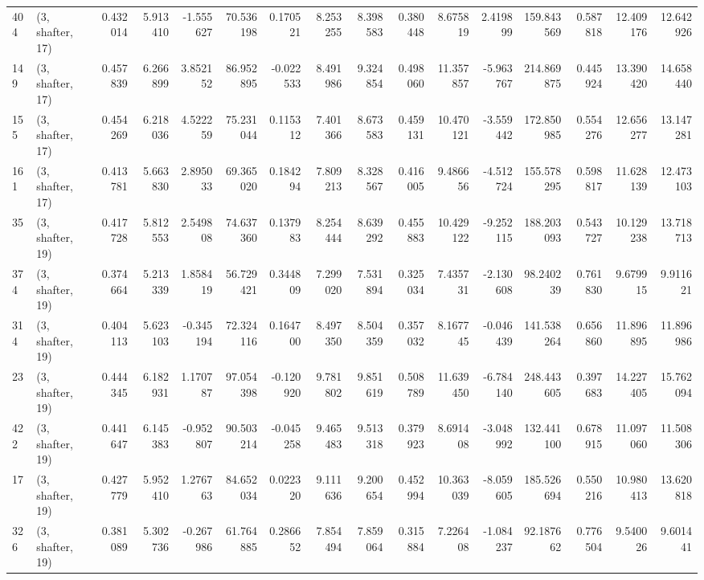 \begin{tabular}{llrrrrrrrrrrrrrr}
404 &  (3, shafter, 17) &   0.432014 &   5.913410 &  -1.555627 &    70.536198 &   0.170521 &   8.253255 &   8.398583 &  0.380448 &   8.675819 &   2.419899 &   159.843569 &  0.587818 &  12.409176 &  12.642926 \\
149 &  (3, shafter, 17) &   0.457839 &   6.266899 &   3.852152 &    86.952895 &  -0.022533 &   8.491986 &   9.324854 &  0.498060 &  11.357857 &  -5.963767 &   214.869875 &  0.445924 &  13.390420 &  14.658440 \\
155 &  (3, shafter, 17) &   0.454269 &   6.218036 &   4.522259 &    75.231044 &   0.115312 &   7.401366 &   8.673583 &  0.459131 &  10.470121 &  -3.559442 &   172.850985 &  0.554276 &  12.656277 &  13.147281 \\
161 &  (3, shafter, 17) &   0.413781 &   5.663830 &   2.895033 &    69.365020 &   0.184294 &   7.809213 &   8.328567 &  0.416005 &   9.486656 &  -4.512724 &   155.578295 &  0.598817 &  11.628139 &  12.473103 \\
35  &  (3, shafter, 19) &   0.417728 &   5.812553 &   2.549808 &    74.637360 &   0.137983 &   8.254444 &   8.639292 &  0.455883 &  10.429122 &  -9.252115 &   188.203093 &  0.543727 &  10.129238 &  13.718713 \\
374 &  (3, shafter, 19) &   0.374664 &   5.213339 &   1.858419 &    56.729421 &   0.344809 &   7.299020 &   7.531894 &  0.325034 &   7.435731 &  -2.130608 &    98.240239 &  0.761830 &   9.679915 &   9.911621 \\
314 &  (3, shafter, 19) &   0.404113 &   5.623103 &  -0.345194 &    72.324116 &   0.164700 &   8.497350 &   8.504359 &  0.357032 &   8.167745 &  -0.046439 &   141.538264 &  0.656860 &  11.896895 &  11.896986 \\
23  &  (3, shafter, 19) &   0.444345 &   6.182931 &   1.170787 &    97.054398 &  -0.120920 &   9.781802 &   9.851619 &  0.508789 &  11.639450 &  -6.784140 &   248.443605 &  0.397683 &  14.227405 &  15.762094 \\
422 &  (3, shafter, 19) &   0.441647 &   6.145383 &  -0.952807 &    90.503214 &  -0.045258 &   9.465483 &   9.513318 &  0.379923 &   8.691408 &  -3.048992 &   132.441100 &  0.678915 &  11.097060 &  11.508306 \\
17  &  (3, shafter, 19) &   0.427779 &   5.952410 &   1.276763 &    84.652034 &   0.022320 &   9.111636 &   9.200654 &  0.452994 &  10.363039 &  -8.059605 &   185.526694 &  0.550216 &  10.980413 &  13.620818 \\
326 &  (3, shafter, 19) &   0.381089 &   5.302736 &  -0.267986 &    61.764885 &   0.286652 &   7.854494 &   7.859064 &  0.315884 &   7.226408 &  -1.084237 &    92.187662 &  0.776504 &   9.540026 &   9.601441 \\

\end{tabular}
